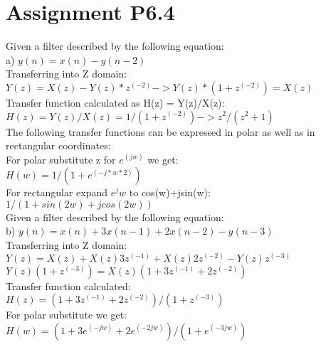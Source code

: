 \section{Assignment P6.4}

Given a filter described by the following equation:\\

a) $y(n)= x(n)-y(n-2)$\\

Transferring into Z domain:\\

$ Y(z) = X(z)-Y(z)*z^(-2) ->  Y(z)*(1+z^(-2)) = X(z)$\\

Transfer function calculated as H(z) = Y(z)/X(z):\\

$ H(z) = Y(z)/X(z) =  1/(1+z^(-2)) -> z^2/(z^2+1) $\\

The following transfer functions can be expressed in polar as well as in rectangular coordinates:\\

For polar substitute z for $e^(jw)$ we get:\\
 
$ H(w) = 1/(1+e^(-j*w*2)) $\\

For rectangular expand $e^jw$ to cos(w)+jsin(w):\\

$ 1/(1+sin(2w)+jcos(2w))$\\

Given a filter described by the following equation:\\
b) $y(n)= x(n) + 3x(n-1) + 2x(n-2) - y(n-3)$\\

Transferring into Z domain:\\

$ Y(z) = X(z) + X(z)3z^(-1) + X(z)2z^(-2) - Y(z)z^(-3) $\\

$ Y(z)(1+z^(-3)) = X(z)(1+3z^(-1)+2z^(-2))$\\

Transfer function calculated:\\

$ H(z)= (1+3z^(-1)+2z^(-2))/(1+z^(-3)) $\\

For polar substitute we get:\\

$ H(w) = (1+3e^(-jw)+2e^(-2jw))/(1+e^(-3jw))$\\

